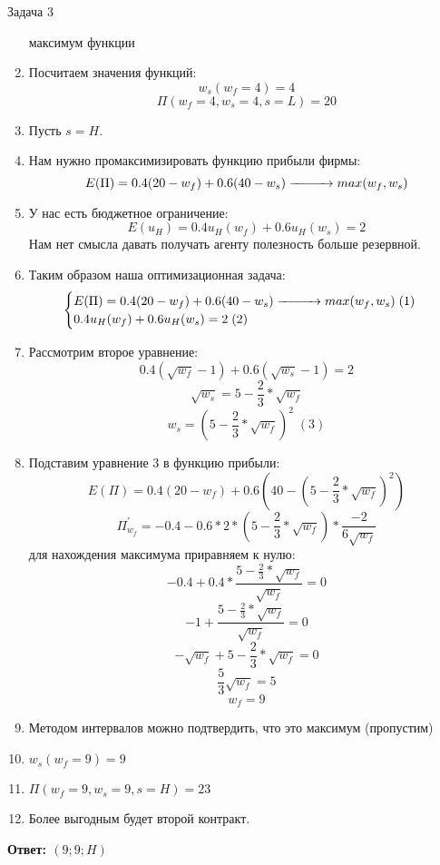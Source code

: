 \begin{mybox}{Задача 3}
\begin{enumerate}
        максимум функции
        \item Посчитаем значения функций: $$w_s(w_f=4)=4$$
        $$\Pi(w_f=4, w_s=4, s=L)=20$$
        \item Пусть $s=H$.
        \item Нам нужно промаксимизировать функцию прибыли фирмы: $$E(\Pi)=0.4(20-w_f)+0.6(40-w_s)\xrightarrow{\makebox[1cm]{}} max(w_f,w_s)$$
        \item У нас есть бюджетное ограничение: $$E(u_H)=0.4u_H(w_f)+0.6u_H(w_s)=2$$ Нам нет смысла давать получать
        агенту полезность больше резервной.
        \item Таким образом наша оптимизационная задача: $$\begin{cases}
            E(\Pi)=0.4(20-w_f)+0.6(40-w_s)\xrightarrow{\makebox[1cm]{}} max(w_f,w_s) \;(1)\\
            0.4u_H(w_f)+0.6u_H(w_s)=2\; (2) \\
        \end{cases}$$
        \item Рассмотрим второе уравнение: $$0.4(\sqrt{w_f}-1)+0.6(\sqrt{w_s}-1)=2$$
        $$\sqrt{w_s}=5-\frac{2}{3}*\sqrt{w_f}$$
        $$w_s=(5-\frac{2}{3}*\sqrt{w_f})^2\;(3)$$
        \item Подставим уравнение 3 в функцию прибыли: $$E(\Pi)=0.4(20-w_f)+0.6(40-(5-\frac{2}{3}*\sqrt{w_f})^2)$$
        $$\Pi^{'}_{w_f}=-0.4-0.6*2*(5-\frac{2}{3}*\sqrt{w_f})*\frac{-2}{6\sqrt{w_f}}$$ для нахождения максимума
        приравняем к нулю:
        $$-0.4+0.4*\frac{5-\frac{2}{3}*\sqrt{w_f}}{\sqrt{w_f}}=0$$
        $$-1+\frac{5-\frac{2}{3}*\sqrt{w_f}}{\sqrt{w_f}}=0$$
        $$-\sqrt{w_f}+5-\frac{2}{3}*\sqrt{w_f}=0$$
        $$\frac{5}{3}\sqrt{w_f}=5$$
        $$w_f=9$$
        \item Методом интервалов можно подтвердить, что это максимум (пропустим)
        \item $w_s(w_f=9)=9$
        \item $\Pi(w_f=9, w_s=9, s=H)=23$
        \item Более выгодным будет второй контракт.
    \end{enumerate}
    \textbf{Ответ: $(9;9;H)$}\\\\


\end{mybox}
